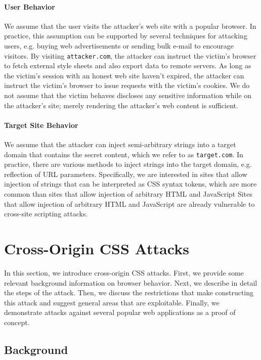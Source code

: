 \documentclass{acm_proc_article-sp}
\begin{document}
\paragraph{User Behavior}
We assume that the user visits the attacker's web site with a popular browser. In practice, this assumption can be supported by several techniques for attacking users, e.g. buying web advertisements or sending bulk e-mail to encourage visitors. By visiting \texttt{attacker.com}, the attacker can instruct the victim's browser to fetch external style sheets and also export data to remote servers. As long as the victim's session with an honest web site haven't expired, the attacker can instruct the victim's browser to issue requests with the victim's cookies.
We do not assume that the victim behaves discloses any sensitive information
while on the attacker's site; merely rendering the attacker's web content
is sufficient.

\paragraph{Target Site Behavior}
We assume that the attacker can inject semi-arbitrary strings into a target
domain that contains the secret content, which we refer to as
\texttt{target.com}. In practice, there are various methods to inject strings
into the target domain, e.g. reflection of URL parameters. Specifically, we
are interested in sites that allow injection of strings that can be
interpreted as CSS syntax tokens, which are more common than sites that allow
injection of arbitrary HTML and JavaScript Sites that allow injection of
arbitrary HTML and JavaScript are already vulnerable to cross-site scripting
attacks.

\section{Cross-Origin CSS Attacks} \label{sec:attacks}
In this section, we introduce cross-origin CSS attacks. First, we provide some
relevant background information on browser behavior. Next, we describe in
detail the steps of the attack. Then, we discuss the restrictions that make
constructing this attack and suggest general areas that are exploitable.
Finally, we demonstrate attacks against several popular web applications as a proof of concept.

\subsection{Background}
\end{document}
